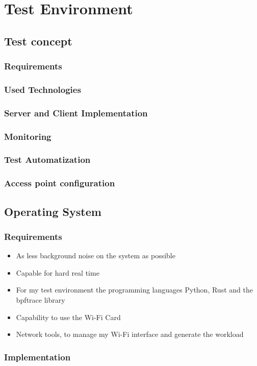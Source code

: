 \chapter{Test Environment}
\section{Test concept}
\subsection{Requirements}
\subsection{Used Technologies}
\subsection{Server and Client Implementation}
\subsection{Monitoring}
\subsection{Test Automatization}
\subsection{Access point configuration}
\section{Operating System}
\subsection{Requirements}
\begin{itemize}
    \item As less background noise on the system as possible
    \item Capable for hard real time
    \item For my test environment the programming languages Python, Rust and the bpftrace library
    \item Capability to use the Wi-Fi Card
    \item Network tools, to manage my Wi-Fi interface and generate the workload
\end{itemize}

\subsection{Implementation}

